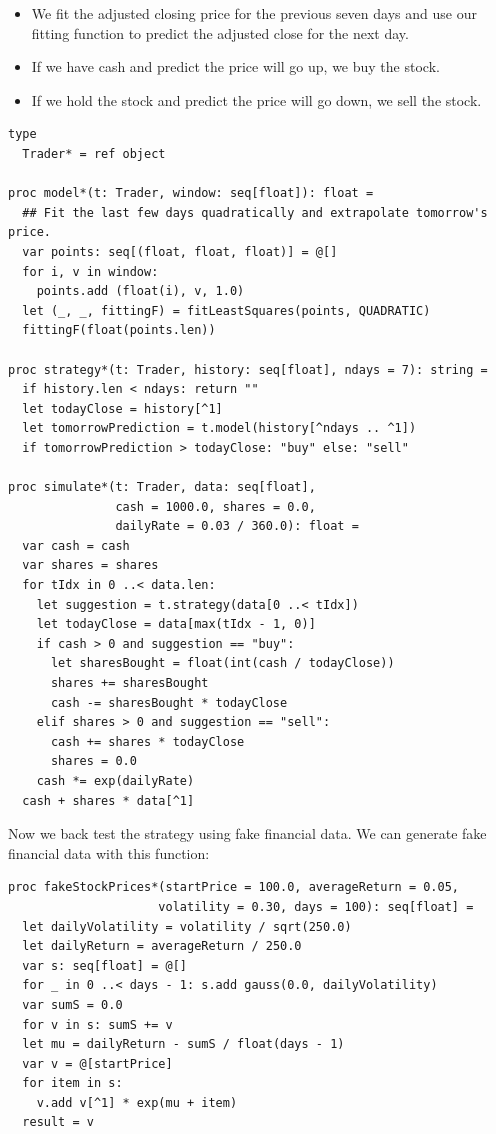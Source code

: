 \documentclass[justified, sixbynine]{tufte-book}
\def\ft{\small\tt}
\theoremstyle{plain}%
\newtheorem * {corollary}{Corollary}
\theoremstyle{definition}
\theoremstyle{remark}
\newtheorem * {remark}{Remark}
\newtheorem * {note}{Note}
\begin{document}
\begin{fullwidth}
\begin{itemize}
\item We fit the adjusted closing price for the previous seven days and use our fitting function to predict the adjusted close for the next day.
\item If we have cash and predict the price will go up, we buy the stock.
\item If we hold the stock and predict the price will go down, we sell the stock.
\end{itemize}


\begin{lstlisting}[caption={in file: {\ft nlib/finance.nim}}]
type
  Trader* = ref object

proc model*(t: Trader, window: seq[float]): float =
  ## Fit the last few days quadratically and extrapolate tomorrow's price.
  var points: seq[(float, float, float)] = @[]
  for i, v in window:
    points.add (float(i), v, 1.0)
  let (_, _, fittingF) = fitLeastSquares(points, QUADRATIC)
  fittingF(float(points.len))

proc strategy*(t: Trader, history: seq[float], ndays = 7): string =
  if history.len < ndays: return ""
  let todayClose = history[^1]
  let tomorrowPrediction = t.model(history[^ndays .. ^1])
  if tomorrowPrediction > todayClose: "buy" else: "sell"

proc simulate*(t: Trader, data: seq[float],
               cash = 1000.0, shares = 0.0,
               dailyRate = 0.03 / 360.0): float =
  var cash = cash
  var shares = shares
  for tIdx in 0 ..< data.len:
    let suggestion = t.strategy(data[0 ..< tIdx])
    let todayClose = data[max(tIdx - 1, 0)]
    if cash > 0 and suggestion == "buy":
      let sharesBought = float(int(cash / todayClose))
      shares += sharesBought
      cash -= sharesBought * todayClose
    elif shares > 0 and suggestion == "sell":
      cash += shares * todayClose
      shares = 0.0
    cash *= exp(dailyRate)
  cash + shares * data[^1]
\end{lstlisting}

Now we back test the strategy using fake financial data. We can generate fake financial data with this function:

\begin{lstlisting}[caption={in file: {\ft nlib/finance.nim}}]
proc fakeStockPrices*(startPrice = 100.0, averageReturn = 0.05,
                     volatility = 0.30, days = 100): seq[float] =
  let dailyVolatility = volatility / sqrt(250.0)
  let dailyReturn = averageReturn / 250.0
  var s: seq[float] = @[]
  for _ in 0 ..< days - 1: s.add gauss(0.0, dailyVolatility)
  var sumS = 0.0
  for v in s: sumS += v
  let mu = dailyReturn - sumS / float(days - 1)
  var v = @[startPrice]
  for item in s:
    v.add v[^1] * exp(mu + item)
  result = v
\end{lstlisting}


\end{fullwidth}
\end{document}
